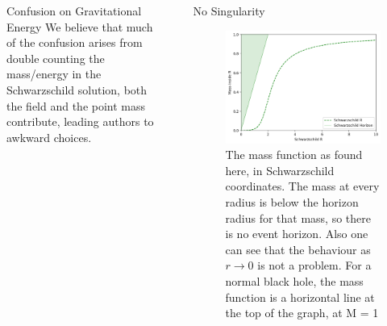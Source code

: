 \documentclass[final]{beamer}
\newlength{\sepwidth}
\newlength{\colwidth}
\newcommand{\separatorcolumn}{\begin{column}{\sepwidth}\end{column}}
\begin{document}
\begin{frame}[t]
\begin{columns}[t]
\begin{column}{\colwidth}
\begin{alertblock}{Confusion on Gravitational Energy}
We believe that much of the confusion arises from double counting the mass/energy in the Schwarzschild solution, both the field and the point mass contribute, leading authors to awkward choices. 

\end{alertblock}


\end{column}

\separatorcolumn


\begin{column}{\colwidth}

  \begin{exampleblock}{No Singularity}

    \begin{figure}
\includegraphics[width=0.9\columnwidth]{no-horizons-s.png}
\caption{The mass function as found here, in Schwarzschild coordinates. The mass at every radius is below the horizon radius for that mass, so there is no event horizon. Also one can see that the behaviour as $r \rightarrow 0$ is not a problem. For a normal black hole, the mass function is a horizontal line at the top of the graph, at M = 1}
\label{isotropic-energy-hole-s}
\end{figure} 

\end{exampleblock}


\end{column}
\end{columns}
\end{frame}
\end{document}
